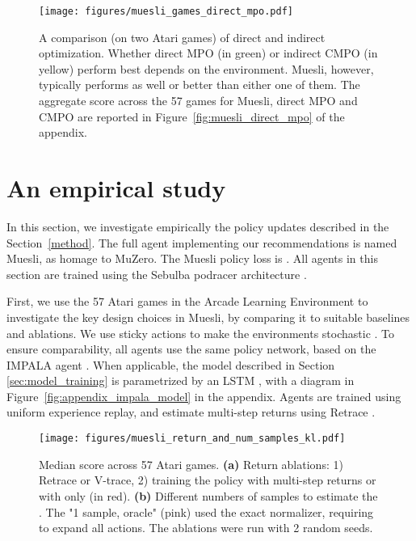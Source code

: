 \documentclass{article}
\begin{document}
\begin{figure}[t]
\vskip 0.1in
\begin{center}
\centerline{\texttt{[image: figures/muesli\_games\_direct\_mpo.pdf]}}
\vskip 0.04in
\caption{A comparison (on two Atari games) of direct and indirect optimization. Whether direct MPO (in green) or indirect CMPO (in yellow) perform best depends on the environment. Muesli, however, typically performs as well or better than either one of them. The aggregate score across the 57 games for Muesli, direct MPO and CMPO are reported in Figure~\ref{fig:muesli_direct_mpo} of the appendix.}
\label{fig:muesli_games_direct_mpo}
\end{center}
\vskip -0.28in
\end{figure}

\section{An empirical study}\label{experiments}

In this section, we investigate empirically the policy updates described in the Section~\ref{method}. The full agent implementing our recommendations is named Muesli, as homage to MuZero. The Muesli policy loss is . All agents in this section are trained using the Sebulba podracer architecture \citep{hessel2021sebulba}.

First, we use the 57 Atari games in the Arcade Learning Environment \cite{bellemare2013arcade} to investigate the key design choices in Muesli, by comparing it to suitable baselines and ablations. We use sticky actions to make the environments stochastic \citep{machado2018revisiting}. To ensure comparability, all agents use the same policy network, based on the IMPALA agent \cite{espeholt2018impala}. When applicable, the model described in Section \ref{sec:model_training} is parametrized by an LSTM \cite{hochreiter1997long}, with a diagram in Figure~\ref{fig:appendix_impala_model} in the appendix. Agents are trained using uniform experience replay, and estimate multi-step returns using Retrace \citep{munos2016safe}. 

\begin{figure}[t]
\vskip 0.1in
\begin{center}
\centerline{\texttt{[image: figures/muesli\_return\_and\_num\_samples\_kl.pdf]}}
\vskip -0.08in
\caption{Median score across 57 Atari games.
\textbf{(a)} Return ablations: 1) Retrace or V-trace, 2) training the policy with multi-step returns or with  only (in red).
\textbf{(b)} Different numbers of samples to estimate the . The "1 sample, oracle" (pink) used the exact  normalizer, requiring to expand all actions. The ablations were run with 2 random seeds.}
\label{fig:muesli_return_and_num_samples_kl}
\end{center}
\vskip -0.2in
\end{figure}
\end{document}

